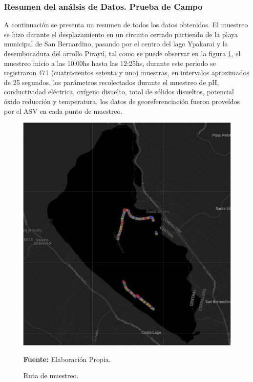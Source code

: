 \subsubsection{Resumen del an\'alsis de Datos. Prueba de Campo}
A continuaci\'on se presenta un resumen de todos los datos obtenidos.
El muestreo se hizo durante el desplazamiento en un circuito cerrado partiendo de la playa municipal de San Bernardino, pasando por el centro del lago Ypakarai  y la desembocadura del arrollo Piray\'u, tal como se puede observar en la figura \ref{fig:ruta}, el muestreo inicio a las 10:00hs hasta las 12:25hs, durante este periodo se registraron 471 (cuatrocientos setenta y uno) muestras, en intervalos aproximados de 25 segundos, los par\'ametros  recolectados durante el muestreo de pH, conductividad el\'ectrica, ox\'igeno disuelto, total de s\'olidos disueltos, potencial \'oxido reducci\'on y temperatura, los datos de georeferenciaci\'on fueron prove\'idos por el ASV en cada punto de muestreo.
\begin{figure}[H]
        \centering
        \includegraphics[scale=0.7]{Imagenes/cap4/Recorrido.png}
        \caption {Ruta de muestreo. }{\textbf{Fuente:}
        Elaboraci\'on Propia. }
        \label{fig:ruta}
\end{figure}

